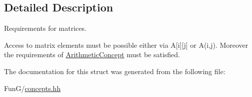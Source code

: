 \subsection{Detailed Description}
Requirements for matrices. 

Access to matrix elements must be possible either via A\mbox{[}i\mbox{]}\mbox{[}j\mbox{]} or A(i,j). Moreover the requirements of \hyperlink{structFunG_1_1Concepts_1_1ArithmeticConcept}{Arithmetic\-Concept} must be satisfied. 

The documentation for this struct was generated from the following file\-:\begin{DoxyCompactItemize}
\item 
Fun\-G/\hyperlink{concepts_8hh}{concepts.\-hh}\end{DoxyCompactItemize}
